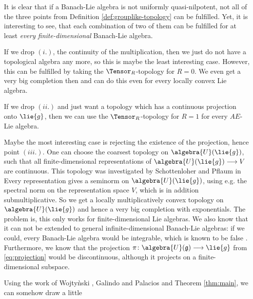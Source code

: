 \documentclass[
11pt,                          %
english                        %
]{article}
\begin{document}
\begin{remark}
	It is clear that if a Banach-Lie algebra is not uniformly quasi-nilpotent,
	not all of the three points from Definition \ref{def:grouplike-topology} can be
	fulfilled. Yet, it is interesting to see, that each combination of two of them
	can be fulfilled for at least \emph{every finite-dimensional} Banach-Lie 
	algebra.
	\begin{remarklist}
		\item
		If we drop $(i.)$, the continuity of the multiplication, then we just do not
		have a topological algebra any more, so this is maybe the least interesting
		case. However, this can be fulfilled by taking the $\Tensor_R$-topology for 
		$R = 0$. We even get a very big completion then and can do this even for
		every locally convex Lie algebra.
		
		\item
		If we drop $(ii.)$ and just want a topology which has a continuous 
		projection onto $\lie{g}$, then we can use the $\Tensor_R$-topology for 
		$R = 1$ for every $AE$-Lie algebra.

		\item
		Maybe the most interesting case is rejecting the existence of the 
		projection, hence point $(iii.)$. One can choose 
		the coarsest topology on $\algebra{U}(\lie{g})$, such that all 
		finite-dimensional representations of $\algebra{U}(\lie{g}) 
		\longrightarrow V$ are continuous. This topology was investigated by
		Schottenloher and Pflaum in \cite{pflaum.schottenloher:1998a}
		Every representation gives a seminorm on $\algebra{U}(\lie{g})$, using e.g.
		the spectral norm on the representation space $V$, which is in addition
		submultiplicative. So we get a locally multiplicatively convex topology
		on $\algebra{U}(\lie{g})$ and hence a very big completion with exponentials.
		The problem is, this only works for finite-dimensional Lie algebras. We also 
		know that it can not be extended to general infinite-dimensional Banach-Lie 
		algebras: if we could, every Banach-Lie algebra would be integrable, which 
		is known to be false \cite[Remark 1.14.15]{duistermaat.kolk:2000a}. 
		Furthermore, we know that the projection $\pi \colon
		\algebra{U}(\mathfrak{g}) \longrightarrow \lie{g}$ from
		\eqref{eq:projection} would be discontinuous, although it projects on a
		finite-dimensional subspace.
	\end{remarklist}
\end{remark}
Using the work of Wojty\`nski \cite{wojtynski:1998a}, Galindo and Palacios 
\cite{galindo.palacios:} and Theorem \ref{thm:main}, we can somehow draw a little 
\end{document}
